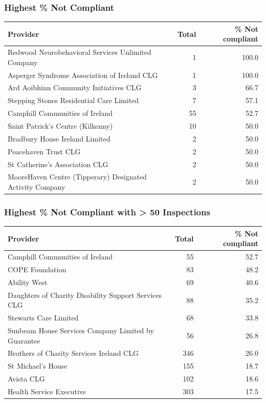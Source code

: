 \documentclass[a4paper,11pt,twoside]{article}
\begin{document}
\subsubsection{Highest \% Not Compliant}
\label{sec:org9f3b61c}

\begin{center}
\begin{tabular}{lrr}
Provider & Total & \% Not compliant\\[0pt]
\hline
Redwood Neurobehavioral Services Unlimited Company & 1 & 100.0\\[0pt]
Asperger Syndrome Association of Ireland CLG & 1 & 100.0\\[0pt]
Ard Aoibhinn Community Initiatives CLG & 3 & 66.7\\[0pt]
Stepping Stones Residential Care Limited & 7 & 57.1\\[0pt]
Camphill Communities of Ireland & 55 & 52.7\\[0pt]
Saint Patrick's Centre (Kilkenny) & 10 & 50.0\\[0pt]
Bradbury House Ireland Limited & 2 & 50.0\\[0pt]
Peacehaven Trust CLG & 2 & 50.0\\[0pt]
St Catherine's Association CLG & 2 & 50.0\\[0pt]
MooreHaven Centre (Tipperary) Designated Activity Company & 2 & 50.0\\[0pt]
\end{tabular}
\end{center}
\subsubsection{Highest \% Not Compliant with > 50 Inspections}
\label{sec:org5115a17}

\begin{center}
\begin{tabular}{lrr}
Provider & Total & \% Not compliant\\[0pt]
\hline
Camphill Communities of Ireland & 55 & 52.7\\[0pt]
COPE Foundation & 83 & 48.2\\[0pt]
Ability West & 69 & 40.6\\[0pt]
Daughters of Charity Disability Support Services CLG & 88 & 35.2\\[0pt]
Stewarts Care Limited & 68 & 33.8\\[0pt]
Sunbeam House Services Company Limited by Guarantee & 56 & 26.8\\[0pt]
Brothers of Charity Services Ireland CLG & 346 & 26.0\\[0pt]
St Michael's House & 155 & 18.7\\[0pt]
Avista CLG & 102 & 18.6\\[0pt]
Health Service Executive & 303 & 17.5\\[0pt]
\end{tabular}
\end{center}
\end{document}
